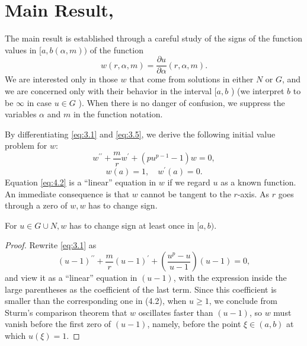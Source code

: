 \section{Main Result, }\label{sec:4}

The main result is established through a careful study of the signs of the function
values in $[a,b(\alpha,m))$ of the function
\begin{equation}\label{eq:4.1}
  w(r,\alpha,m) = \frac{\partial u}{\partial \alpha} (r,\alpha,m).
\end{equation}
We are interested only in those $w$ that come from solutions in either $N$ or $G$,
and we are concerned only with their behavior in the interval $[a, b$ )
(we interpret $b$ to be $\infty$ in case $u \in G$ ).
When there is no danger of confusion, we suppress the variables $\alpha$ and $m$ in the
function notation.

By differentiating \eqref{eq:3.1} and \eqref{eq:3.5},
we derive the following initial value problem for $w$:
\begin{equation}\label{eq:4.2}
  w^{\prime \prime}+\frac{m}{r} w^{\prime}+\left(p u^{p-1}-1\right) w=0,
\end{equation}
\begin{equation}\label{eq:4.3}
  w(a)=1, \quad w^{\prime}(a)=0.
\end{equation}
Equation \eqref{eq:4.2} is a ``linear'' equation in $w$ if we regard $u$ as a known function.
An immediate consequence is that $w$ cannot be tangent to the $r$-axis.
As $r$ goes through a zero of $w, w$ has to change sign.

\begin{lemma}\label{lemma:17}
  For $u \in G \cup N, w$ has to change sign at least once in $[a, b)$.
\end{lemma}

\begin{proof}
  Rewrite \eqref{eq:3.1} as
  \begin{equation}\label{eq:4.4}
    (u-1)^{\prime \prime}+\frac{m}{r}(u-1)^{\prime}+\left(\frac{u^p-u}{u-1}\right)(u-1) = 0,
  \end{equation}
  and view it as a ``linear'' equation in $(u-1)$, with the expression inside the large
  parentheses as the coefficient of the last term. Since this coefficient is smaller than the
  corresponding one in (4.2), when $u \geq 1$, we conclude from Sturm's comparison theorem
  that $w$ oscillates faster than $(u-1)$, so $w$ must vanish before the first zero of $(u-1)$,
  namely, before the point $\xi \in(a, b)$ at which $u(\xi)=1$.
\end{proof}

